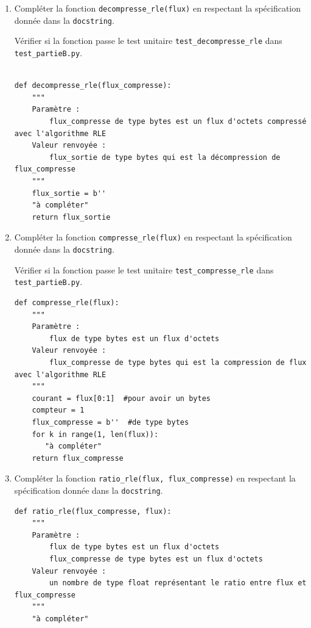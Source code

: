 \documentclass[a4paper, french, 12pt]{article}  %
\newcounter{thme}
\newcounter{def}
\newcounter{alg}
\begin{document}
\begin{enumerate}[resume]


\item  Compléter la fonction \verb+decompresse_rle(flux)+ en respectant la spécification donnée dans la \texttt{docstring}. 


Vérifier si la fonction passe le test unitaire \verb+test_decompresse_rle+ dans \texttt{test\_partieB.py}.


\begin{lstlisting}[style=rond]

def decompresse_rle(flux_compresse):
    """
    Paramètre :
        flux_compresse de type bytes est un flux d'octets compressé avec l'algorithme RLE
    Valeur renvoyée :
        flux_sortie de type bytes qui est la décompression de flux_compresse
    """
    flux_sortie = b''
    "à compléter"
    return flux_sortie
\end{lstlisting}

\item Compléter la fonction \verb+compresse_rle(flux)+ en respectant la spécification donnée dans la \texttt{docstring}. 


Vérifier si la fonction passe le test unitaire \verb+test_compresse_rle+ dans \texttt{test\_partieB.py}.


\begin{lstlisting}[style=rond]
def compresse_rle(flux):
    """
    Paramètre :
        flux de type bytes est un flux d'octets
    Valeur renvoyée :
        flux_compresse de type bytes qui est la compression de flux avec l'algorithme RLE
    """
    courant = flux[0:1]  #pour avoir un bytes
    compteur = 1
    flux_compresse = b''  #de type bytes
    for k in range(1, len(flux)):
       "à compléter"
    return flux_compresse
\end{lstlisting}


\item Compléter la fonction \verb+ratio_rle(flux, flux_compresse)+ en respectant la spécification donnée dans la \texttt{docstring}. 

\begin{lstlisting}[style=rond]
def ratio_rle(flux_compresse, flux):
    """
    Paramètre :
        flux de type bytes est un flux d'octets
        flux_compresse de type bytes est un flux d'octets
    Valeur renvoyée :
        un nombre de type float représentant le ratio entre flux et flux_compresse
    """
    "à compléter"
\end{lstlisting}


\end{enumerate}
\end{document}
